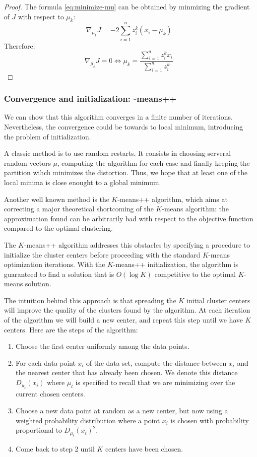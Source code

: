 \documentclass[toc, titlepaged]{../cs-classes/cs-classes}
\begin{document}
\begin{proof}
    The formula \eqref{eq:minimize-mu} can be obtained by minmizing the gradient of $J$ with respect to $\mu_k$:
    \begin{equation*}
        \nabla_{\mu_k} J = -2 \sum_{i=1}^n z_i^k (x_i-\mu_k)
    \end{equation*}
    Therefore:
    \begin{equation*}
        \nabla_{\mu_k} J = 0 \iff \mu_k = \frac{\sum_{i=1}^n z_i^k x_i}{\sum_{i=1}^n z_i^k}
    \end{equation*}
\end{proof}

\subsubsection{Convergence and initialization: -means++}
We can show that this algorithm converges in a finite number of iterations. Nevertheless, the convergence could be towards to local minimum, introducing the problem of initialization.

A classic method is to use random restarts. It consists in choosing serveral random vectors $\mu$, computing the algorithm for each case and finally keeping the partition wihch minimizes the distortion. Thus, we hope that at least one of the local minima is close enought to a global minimum.

Another well known method is the $K$-means++ algorithm, which aims at correcting a major theoretical shortcoming of the $K$-means algorithm: the approximation found can be arbitrarily bad with respect to the objective function compared to the optimal clustering.

The $K$-means++ algorithm addresses this obstacles by specifying a procedure to initialize the cluster centers before proceeding with the standard $K$-means optimization iterations. With the $K$-means++ initialization, the algorithm is guaranteed to find a solution that is $O(\log K)$ competitive to the optimal $K$-means solution.

The intuition behind this approach is that spreading the $K$ initial cluster centers will improve the quality of the clusters found by the algorithm. At each iteration of the algorithm we will build a new center, and repeat this step until we have $K$ centers. Here are the steps of the algorithm:
\begin{enumerate}
    \item Choose the first center uniformly among the data points.
    \item For each data point $x_i$ of the data set, compute the distance between $x_i$ and the nearest center that has already been chosen. We denote this distance $D_{\mu_t}(x_i)$ where $\mu_t$ is specified to recall that we are minimizing over the current chosen centers.
    \item Choose a new data point at random as a new center, but now using a weighted probability distribution where a point $x_i$ is chosen with probability proportional to $D_{\mu_t}(x_i)^2$.
    \item Come back to step 2 until $K$ centers have been chosen.
\end{enumerate}
\end{document}
